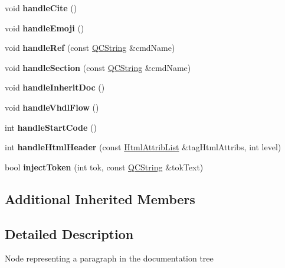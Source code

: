 \begin{DoxyCompactItemize}
\item 
\mbox{\label{class_doc_para_a8b963b6054712a3af42e2d1db7c6e730}} 
void {\bfseries handle\+Cite} ()
\item 
\mbox{\label{class_doc_para_a222a4324fe7e972d3d35909f810fcc6b}} 
void {\bfseries handle\+Emoji} ()
\item 
\mbox{\label{class_doc_para_a1f2c324f92f2624c9d439810a7a4aa1e}} 
void {\bfseries handle\+Ref} (const \mbox{\hyperlink{class_q_c_string}{Q\+C\+String}} \&cmd\+Name)
\item 
\mbox{\label{class_doc_para_a7cc062ba5edc3ca9d38a840e8e0c5094}} 
void {\bfseries handle\+Section} (const \mbox{\hyperlink{class_q_c_string}{Q\+C\+String}} \&cmd\+Name)
\item 
\mbox{\label{class_doc_para_a0eecb8116d4410392244f76fb8c209e6}} 
void {\bfseries handle\+Inherit\+Doc} ()
\item 
\mbox{\label{class_doc_para_ab5639797f3123c08c83f16819f7a74d7}} 
void {\bfseries handle\+Vhdl\+Flow} ()
\item 
\mbox{\label{class_doc_para_ac90f029b9281748cbb6f1220a174f5ab}} 
int {\bfseries handle\+Start\+Code} ()
\item 
\mbox{\label{class_doc_para_a8ac011de4f1337a5c9693afdf63ad025}} 
int {\bfseries handle\+Html\+Header} (const \mbox{\hyperlink{class_html_attrib_list}{Html\+Attrib\+List}} \&tag\+Html\+Attribs, int level)
\item 
\mbox{\label{class_doc_para_ae4273ab51ee6dc8934bff7b7d9e8440a}} 
bool {\bfseries inject\+Token} (int tok, const \mbox{\hyperlink{class_q_c_string}{Q\+C\+String}} \&tok\+Text)
\end{DoxyCompactItemize}
\subsection*{Additional Inherited Members}


\subsection{Detailed Description}
Node representing a paragraph in the documentation tree 

